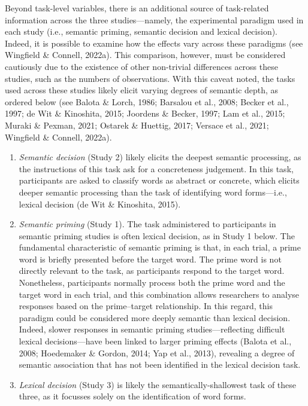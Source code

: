 \documentclass[
  12pt,
  man,floatsintext]{apa7}
\begin{document}
Beyond task-level variables, there is an additional source of task-related information across the three studies---namely, the experimental paradigm used in each study (i.e., semantic priming, semantic decision and lexical decision). Indeed, it is possible to examine how the effects vary across these paradigms (see Wingfield \& Connell, 2022a). This comparison, however, must be considered cautiously due to the existence of other non-trivial differences across these studies, such as the numbers of observations. With this caveat noted, the tasks used across these studies likely elicit varying degrees of semantic depth, as ordered below (see Balota \& Lorch, 1986; Barsalou et al., 2008; Becker et al., 1997; de Wit \& Kinoshita, 2015; Joordens \& Becker, 1997; Lam et al., 2015; Muraki \& Pexman, 2021; Ostarek \& Huettig, 2017; Versace et al., 2021; Wingfield \& Connell, 2022a).

\begin{enumerate}
\def\labelenumi{\arabic{enumi}.}
\item
  \emph{Semantic decision} (Study 2) likely elicits the deepest semantic processing, as the instructions of this task ask for a concreteness judgement. In this task, participants are asked to classify words as abstract or concrete, which elicits deeper semantic processing than the task of identifying word forms---i.e., lexical decision (de Wit \& Kinoshita, 2015).
\item
  \emph{Semantic priming} (Study 1). The task administered to participants in semantic priming studies is often lexical decision, as in Study 1 below. The fundamental characteristic of semantic priming is that, in each trial, a prime word is briefly presented before the target word. The prime word is not directly relevant to the task, as participants respond to the target word. Nonetheless, participants normally process both the prime word and the target word in each trial, and this combination allows researchers to analyse responses based on the prime--target relationship. In this regard, this paradigm could be considered more deeply semantic than lexical decision. Indeed, slower responses in semantic priming studies---reflecting difficult lexical decisions---have been linked to larger priming effects (Balota et al., 2008; Hoedemaker \& Gordon, 2014; Yap et al., 2013), revealing a degree of semantic association that has not been identified in the lexical decision task.
\item
  \emph{Lexical decision} (Study 3) is likely the semantically-shallowest task of these three, as it focusses solely on the identification of word forms.
\end{enumerate}
\end{document}
